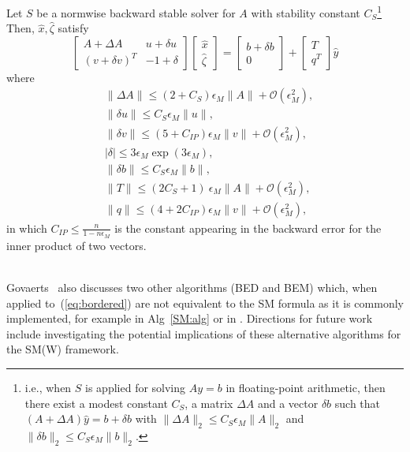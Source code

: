 \documentclass{siamltex}
\newcommand{\eqnref}[1]{(\ref{#1})}
\newcommand{\eps}{\epsilon}
\begin{document}
\begin{proposition}
Let $S$ be a normwise backward stable solver for $A$ with stability constant $C_S$\footnote{i.e., when $S$ is applied for solving $A y = b$ in floating-point arithmetic, then there exist a modest constant $C_S$, a matrix $\Delta A$ and a vector $\delta b$ such that $(A + \Delta A) \hat y = b + \delta b$ with $\| \Delta A\|_2 \leq C_S \eps_M \|A\|_2$ and $\| \delta b\|_2 \leq C_S \eps_M \|b\|_2$.} Then, $\hat x, \hat \zeta$ satisfy
\begin{equation}
\label{eq:pert_bordered}
\begin{bmatrix}
A+ \Delta A & u + \delta u\\
(v + \delta v)^T & -1+ \delta
\end{bmatrix}
\begin{bmatrix}
\hat x\\
\hat \zeta
\end{bmatrix} =
\begin{bmatrix}
b + \delta b\\
0
\end{bmatrix}
+ 
\begin{bmatrix}
T\\
q^T
\end{bmatrix} \hat y
\end{equation}
where 
\begin{align*}
 &
\| \Delta A\|  \leq (2+C_S) \eps_M \|A\| + \mathcal{O}(\eps_M^2),\\
 &\| \delta u\| \leq C_S \eps_M \|u\|,\\
 & 
\| \delta v\|  \leq (5+C_{IP}) \eps_M \|v\| + \mathcal{O}(\eps_M^2),\\
 &|\delta|  \leq 3 \eps_M \exp(3\eps_M),\\
 &\| \delta b\|  \leq C_{S} \eps_M  \|b\|,\\
 & 
\| T\| \leq (2C_S + 1)\ \eps_M \|A\| + \mathcal{O}(\eps_M^2),\\
 & 
\| q\|  \leq (4 + 2C_{IP}) \eps_M \|v\| + \mathcal{O}(\eps_M^2),
\end{align*}
in which $C_{IP} \leq \frac{n}{1-n \eps_M}$ is the constant appearing in the backward error for the inner product of two vectors. 
\end{proposition}
\ \\
Govaerts~\cite{Govaerts91} also discusses two other algorithms (BED and BEM) which, when applied to~\eqnref{eq:bordered} are not equivalent to the SM formula as it is commonly implemented, for example in Alg~\ref{SM:alg} or in \cite[p. 487]{Higham02}. Directions for future work include investigating the potential implications of these alternative algorithms for the SM(W) framework.
\end{document}
